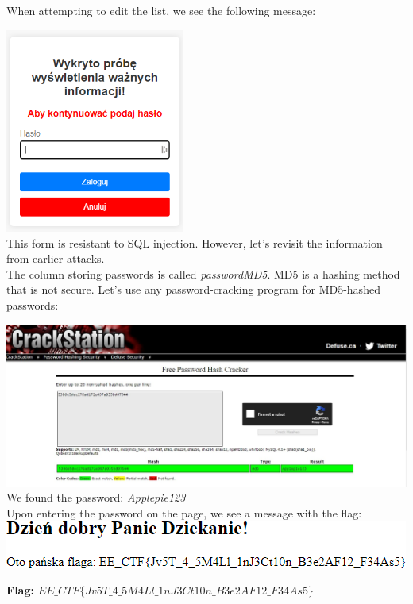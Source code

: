 \documentclass{article}
\begin{document}
When attempting to edit the list, we see the following message:
\begin{multicols}{2}
    \includegraphics[width=0.44\textwidth]{"image35.png"}
    \columnbreak \\
    This form is resistant to SQL injection. However, let’s revisit the information from earlier attacks.
    \vspace{3mm} \\
    The column storing passwords is called \textit{passwordMD5}. MD5 is a hashing method that is not secure. Let’s use any password-cracking program for MD5-hashed passwords:
\end{multicols}
\includegraphics[width=\textwidth]{"image36.jpeg"}
We found the password: \textit{Applepie123}
\vspace{3mm} \\
Upon entering the password on the page, we see a message with the flag:
\vspace{3mm} \\
\includegraphics[width=\textwidth]{"image37.png"}
\vspace{3mm}

\textbf{Flag:} $ EE\_CTF\{Jv5T\_4\_5M4Ll\_1nJ3Ct10n\_B3e2AF12\_F34As5\} $
\end{document}
